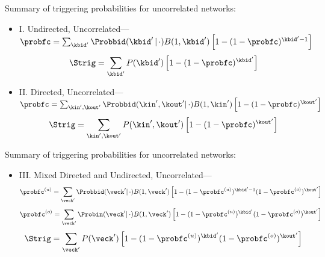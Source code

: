 \begin{frame}
  \small
  \begin{block}{Summary of triggering probabilities for uncorrelated networks:\cite{dodds2011c}}
    \begin{itemize}
    \item<1->
    I. Undirected, Uncorrelated---
    $
    \probfc = 
    \sum_{\kbid'}
    \Probbid(\kbid'\, | \, \cdot)
    B(1,\kbid')
    \left[
      1
      -
      (1-\probfc)^{\kbid'-1}
    \right]
    $
    $$
    \Strig
    =
    \sum_{\kbid'}
    P(\kbid')
    \left[
      1 - (1-\probfc)^{\kbid'}
    \right]
    $$
  \item<2->
    II. Directed, Uncorrelated---
    $
    \probfc = 
    \sum_{\kin',\kout'}
    \Probbid(\kin',\kout' | \, \cdot)
    B(1,\kin')
    \left[
      1
      -
      (1-\probfc)^{\kout'}
    \right]
    $
    $$
    \Strig
    =
    \sum_{\kin',\kout'}
    P(\kin',\kout')
    \left[
      1 - (1-\probfc)^{\kout'}
    \right]
    $$
  \end{itemize}
  \end{block}
\end{frame}

\begin{frame}
  \small
  \begin{block}{Summary of triggering probabilities for uncorrelated networks:}
    \begin{itemize}
  \item<1->
    III. Mixed Directed and Undirected, Uncorrelated---
    $$
    \probfc^{(u)} 
    = 
    \sum_{\veck'}
    \Probbid(\veck' | \, \cdot)
    B(1,\veck')
    \left[
      1
      -
      (1-\probfc^{(u)})^{\kbid'-1}
      (1-\probfc^{(o)})^{\kout'}
    \right]
    $$
    $$
    \probfc^{(o)} 
    = 
    \sum_{\veck'}
    \Probin(\veck' | \, \cdot)
    B(1,\veck')
    \left[
      1
      -
      (1-\probfc^{(u)})^{\kbid'}
      (1-\probfc^{(o)})^{\kout'}
    \right]
    $$
    $$
    \Strig
    =
    \sum_{\veck'}
    P(\veck')
    \left[
      1 - (1-\probfc^{(u)})^{\kbid'}(1-\probfc^{(o)})^{\kout'}
    \right]
    $$
  \end{itemize}
  \end{block}
\end{frame}


